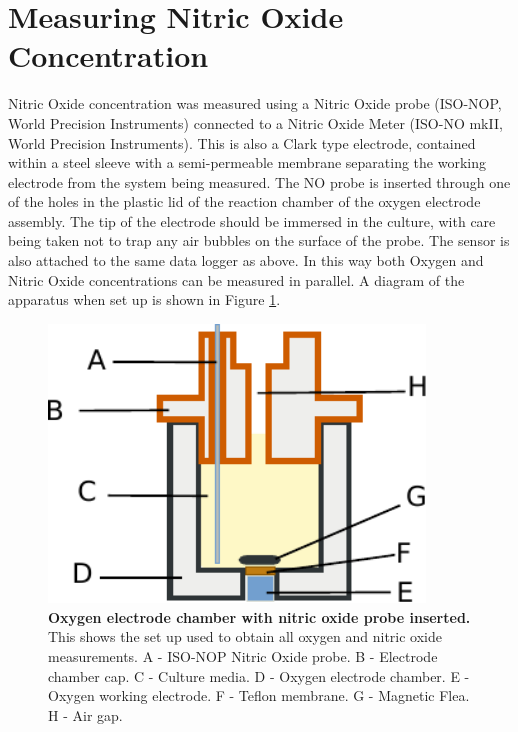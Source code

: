 \section{Measuring Nitric Oxide Concentration}
Nitric Oxide concentration was measured using a Nitric Oxide probe (ISO-NOP, World Precision Instruments) connected to a Nitric Oxide Meter (ISO-NO mkII, World Precision Instruments). This is also a Clark type electrode, contained within a steel sleeve with a semi-permeable membrane separating the working electrode from the system being measured\cite{Liu2005,Bedioui2003,Serpe2007}. The NO probe is inserted through one of the holes in the plastic lid of the reaction chamber of the oxygen electrode assembly. The tip of the electrode should be immersed in the culture, with care being taken not to trap any air bubbles on the surface of the probe. The sensor is also attached to the same data logger as above. In this way both Oxygen and Nitric Oxide concentrations can be measured in parallel. A diagram of the apparatus when set up is shown in Figure \ref{fig:electrode_chamber}.

\begin{figure}[tbp]
 \begin{center}
 \includegraphics[width=10cm]{./02-materialsmethods/data/electrode_chamber.pdf}
 \caption[Oxygen electrode chamber with nitric oxide probe inserted]{{\bf Oxygen electrode chamber with nitric oxide probe inserted.} This shows the set up used to obtain all oxygen and nitric oxide measurements. A - ISO-NOP Nitric Oxide probe. B - Electrode chamber cap. C - Culture media. D - Oxygen electrode chamber. E - Oxygen working electrode. F - Teflon\texttrademark{} membrane. G - Magnetic Flea. H - Air gap.
 \label{fig:electrode_chamber}}
 \end{center}
\end{figure}


